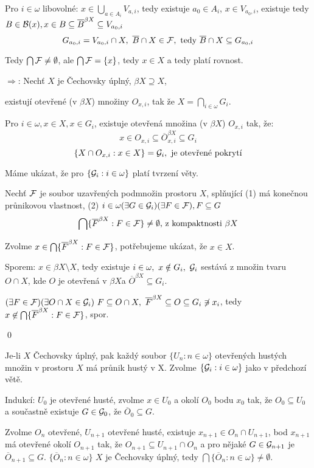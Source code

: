 \documentclass[12pt,a4paper]{article}
\newcommand\BX{\ensuremath{\beta X}}
\newcommand\close{\overline}
\newcommand{\betaClose}[1]{\close #1 ^{\beta X}}
\begin{document}
	Pro $i \in \omega$ libovolné: $x \in \bigcup_{a \in A_i} V_{a,i}$, tedy
	existuje $a_0 \in A_i$, $x \in V_{a_0,i}$, existuje tedy $B \in \p B(x), x
	\in B \subseteq \betaClose B \subseteq V_{a_0,i}$
		$$G_{a_0,i} = V_{a_0,i} \cap X,~\close B \cap X \in \p F,~
		  \text{tedy } \close B \cap X \subseteq G_{a_0,i}$$

	Tedy $\bigcap \mathcal{ F } \neq \emptyset$, ale $\bigcap \mathcal{ F } = \{x\}$, tedy $x
	\in X$ a tedy platí rovnost.


\medskip\noindent$\Rightarrow$: Nechť $X$ je Čechovsky úplný, $\beta X \supseteq X$,

	existují otevřené (v \BX) množiny $O_{x,i}$, tak že $X = \bigcap_{i \in
	\omega} G_i$.

	Pro $i \in \omega, x \in X, x \in G_i$, existuje otevřená množina (v \BX)
	$O_{x,i}$ tak, že:
		$$x \in O_{x,i} \subseteq \betaClose O_{x,i} \subseteq G_i$$
		$$\{X \cap O_{x,i} : x \in X\} = \mathcal{ G }_i,~\text{je otevřené pokrytí}$$

	Máme ukázat, že pro $\{\mathcal{ G }_i : i \in \omega \}$ platí tvrzení věty.

	Nechť $\mathcal{ F }$ je soubor uzavřených podmnožin prostoru $X$, splňující (1) má
	konečnou průnikovou vlastnost, (2) $i \in \omega (\exists G \in \mathcal{ G }_i)
	(\exists F \in \mathcal{ F }), F \subseteq G$
		$$\bigcap \{\betaClose F : F \in \p F\} \neq \emptyset \text{, z
		  kompaktnosti } \beta X$$

	Zvolme $x \in \bigcap \{\betaClose F : F \in \p F\}$, potřebujeme ukázat,
	že $x \in X$.

	Sporem: $x \in \beta X \setminus X$, tedy existuje $i \in \omega,~x \notin
	G_i,~\mathcal{ G }_i$ sestává z množin tvaru $O \cap X$, kde $O$ je otevřená v \BX a
	$\betaClose O \subseteq G_i$.

	$(\exists F \in \p F) (\exists O \cap X \in \p G_i)~F \subseteq O \cap X,~
	\betaClose F \subseteq O \subseteq G_i \not\ni x_i$, tedy $x \not\in
	\bigcap \{\betaClose F : F \in \p F\}$, spor.

	\qed

\veta[Baireova] Je-li $X$ Čechovsky úplný, pak každý soubor $\{U_n : n \in
	\omega\}$ otevřených hustých množin v prostoru $X$ má průnik hustý v X.
\dukaz
	Zvolme $\{\mathcal{ G }_i : i \in \omega\}$ jako v předchozí větě.

	Indukcí: $U_0$ je otevřené husté, zvolme $x \in U_0$ a okolí $O_0$ bodu
	$x_0$ tak, že $O_0 \subseteq U_0$ a součastně existuje $G \in \mathcal{ G }_0$, že
	$\close O_0 \subseteq G$.

	Zvolme $O_n$ otevřené, $U_{n+1}$ otevřené husté, existuje $x_{n+1} \in O_n
	\cap U_{n+1}$, bod $x_{n+1}$ má otevřené okolí $O_{n+1}$ tak, že $O_{n+1}
	\subseteq U_{n+1} \cap O_n$ a pro nějaké $G \in \mathcal{ G }_{n+1}$ je $\close
	O_{n+1} \subseteq G$. $\{\close O_n : n \in \omega\}$ $X$ je Čechovsky
	úplný, tedy $\bigcap \{\close O_n : n \in \omega\} \neq \emptyset$.
\end{document}

